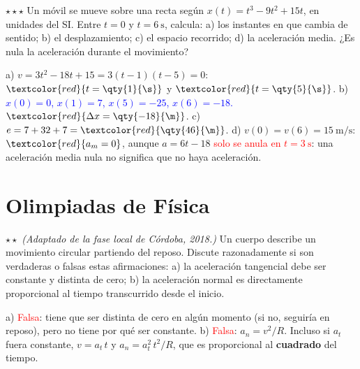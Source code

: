 \begin{exercise}
    \(\star\star\star\) Un móvil se mueve sobre una recta según \(x(t) = t^3 - 9t^2 + 15t\), en unidades del SI. Entre \(t = 0\) y
    \(t = \qty{6}{\s}\), calcula: a) los instantes en que cambia de sentido; b) el desplazamiento; c) el espacio recorrido; d) la
    aceleración media. ¿Es nula la aceleración durante el movimiento?
    \begin{solu}
        a) \(v = 3t^2 - 18t + 15 = 3(t - 1)(t - 5) = 0\): \(\textcolor{red}{t = \qty{1}{\s}}\) y \(\textcolor{red}{t = \qty{5}{\s}}\).
        b) \textcolor{blue}{\(x(0) = 0\), \(x(1) = 7\), \(x(5) = -25\), \(x(6) = -18\).} \(\textcolor{red}{\Delta x = \qty{-18}{\m}}\).
        c) \(e = 7 + 32 + 7 = \textcolor{red}{\qty{46}{\m}}\). d) \(v(0) = v(6) = \qty{15}{\m\per\s}\): \(\textcolor{red}{a_m = 0}\),
        aunque \(a = 6t - 18\) \textcolor{red}{solo se anula en \(t = \qty{3}{\s}\)}: una aceleración media nula no significa que no
        haya aceleración.
    \end{solu}
\end{exercise}

\section{Olimpiadas de Física}\label{sec:ud8-olimpiadas}


\begin{exercise}
    \(\star\star\) \textit{(Adaptado de la fase local de Córdoba, 2018.)} Un cuerpo describe un movimiento circular partiendo del
    reposo. Discute razonadamente si son verdaderas o falsas estas afirmaciones: a) la aceleración tangencial debe ser constante y
    distinta de cero; b) la aceleración normal es directamente proporcional al tiempo transcurrido desde el inicio.
    \begin{solu}
        a) \textcolor{red}{Falsa}: tiene que ser distinta de cero en algún momento (si no, seguiría en reposo), pero no tiene por qué
        ser constante. b) \textcolor{red}{Falsa}: \(a_n = v^2/R\). Incluso si \(a_t\) fuera constante, \(v = a_t\,t\) y
        \(a_n = a_t^2\,t^2/R\), que es proporcional al \textbf{cuadrado} del tiempo.
    \end{solu}
\end{exercise}


